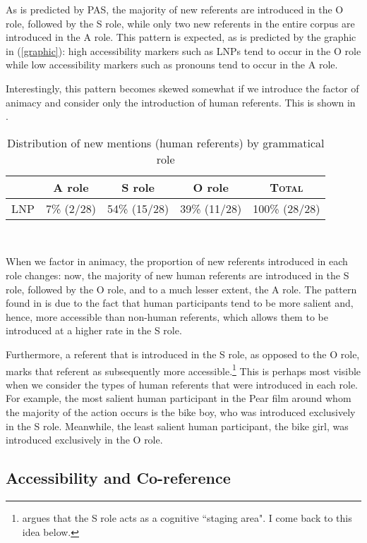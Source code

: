 As is predicted by PAS, the majority of new referents are introduced in the O role, followed by the S role, while only two new referents in the entire corpus are introduced in the A role. This pattern is expected, as is predicted by the graphic in (\ref{graphic}): high accessibility markers such as LNPs tend to occur in the O role while low accessibility markers such as pronouns tend to occur in the A role.

Interestingly, this pattern becomes skewed somewhat if we introduce the factor of animacy and consider only the introduction of human referents. This is shown in .
\begin{table}[htp] 
\begin{center}
\caption{\small{Distribution of new mentions (human referents) by grammatical role}}
\begin{tabular}{| r | c | c | c | c |}\hline
 & A role & S role & O role & \textsc{Total} \\
\hline
 \textsc{LNP} & 7{\%} (2/28) & 54{\%} (15/28) & 39{\%} (11/28) & 100{\%} (28/28) \\
\hline
\end{tabular}\\
\label{newhumanreferents}
\end{center}
\end{table}
When we factor in animacy, the proportion of new referents introduced in each role changes: now, the majority of new human referents are introduced in the S role, followed by the O role, and to a much lesser extent, the A role. The pattern found in  is due to the fact that human participants tend to be more salient and, hence, more accessible than non-human referents, which allows them to be introduced at a higher rate in the S role. 

Furthermore, a referent that is introduced in the S role, as opposed to the O role, marks that referent as subsequently more accessible.\footnote{\citet[831]{dubois1987} argues that the S role acts as a cognitive ``staging area". I come back to this idea below.} This is perhaps most visible when we consider the types of human referents that were introduced in each role. For example, the most salient human participant in the Pear film around whom the majority of the action occurs is the bike boy, who was introduced exclusively in the S role. Meanwhile, the least salient human participant, the bike girl, was introduced exclusively in the O role. 


\subsection{Accessibility and Co-reference}

